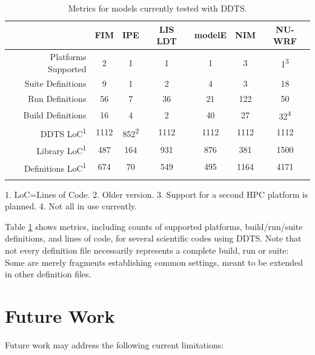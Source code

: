 \documentclass[conference]{IEEEtran}
\begin{document}
\begin{table}[!t]
\centering
\begin{tabular}{r c c c c c c}
\hline
& FIM & IPE & LIS LDT & modelE & NIM & NU-WRF \\ 
\hline
Platforms Supported & 2 & 1 & 1 & 1 & 3 & 1\textsuperscript{3} \\
Suite Definitions & 9 & 1 & 2 & 4 & 3 & 18 \\
Run Definitions & 56 & 7 & 36 & 21 & 122 & 50 \\
Build Definitions & 16 & 4 & 2 & 40 & 27 & 32\textsuperscript{4} \\
DDTS LoC\textsuperscript{1} & 1112 & 852\textsuperscript{2} & 1112 & 1112 & 1112 & 1112 \\
Library LoC\textsuperscript{1} & 487 & 164 & 931 & 876 & 381 & 1500 \\
Definitions LoC\textsuperscript{1} & 674 & 70 & 549 & 495 & 1164 & 4171 \\
\hline
\newline
\end{tabular}
1. LoC=Lines of Code. 2. Older version. 3. Support for a second HPC platform is planned. 4. Not all in use currently.
\newline
\caption{Metrics for models currently tested with DDTS.}
\label{table:metrics}
\end{table}

Table \ref{table:metrics} shows metrics, including counts of supported platforms, build/run/suite definitions, and lines of code, for several scientific codes using DDTS. Note that not every definition file necessarily represents a complete build, run or suite: Some are merely fragments establishing common settings, meant to be extended in other definition files.

\section{Future Work}

Future work may address the following current limitations:
\end{document}
